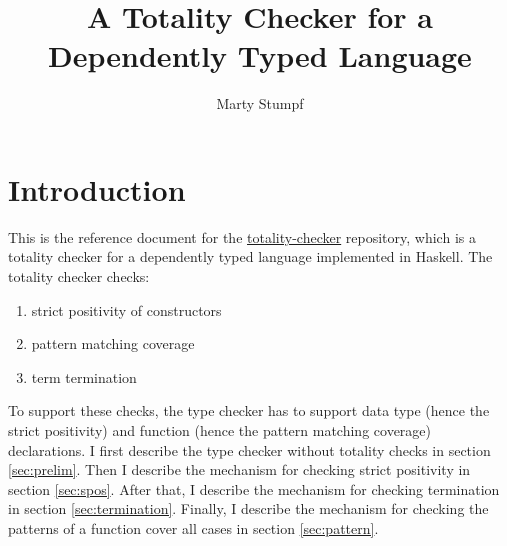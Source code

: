 \documentclass[acmsmall]{acmart}
\numberwithin{figure}{subsection}
\begin{document}
\title{A Totality Checker for a Dependently Typed Language}

%
\author{Marty Stumpf}

%

%
%
\maketitle
\thispagestyle{empty}
\tableofcontents
\clearpage
\section{Introduction}

This is the reference document for the
\href{https://github.com/thealmarty/totality-checker}{totality-checker}
repository, which is a totality checker for a dependently typed language
implemented in Haskell. The totality checker checks:

\begin{enumerate}
  \item strict positivity of constructors
  \item pattern matching coverage
  \item term termination
\end{enumerate}

To support these checks, the type checker has to support data type (hence the
strict positivity) and function (hence the pattern matching coverage)
declarations. I first describe the type checker without totality checks in
section \ref{sec:prelim}. Then I describe the mechanism for checking strict positivity
in section \ref{sec:spos}. After that, I describe the mechanism for checking
termination in section \ref{sec:termination}. Finally, I describe the mechanism
for checking the patterns of a function cover all cases in section
\ref{sec:pattern}.



\end{document}

